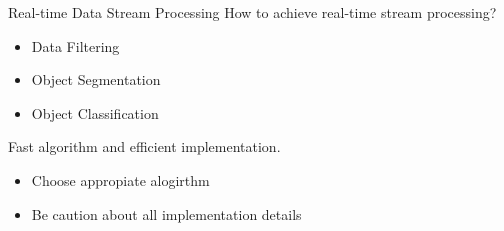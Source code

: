 \documentclass[9pt]{beamer}
\begin{document}
\begin{frame}[fragile]{Real-time Data Stream Processing}
How to achieve real-time stream processing? 
	
\begin{itemize}
	\item {} Data Filtering
	\item {} Object Segmentation
	\item {} Object Classification
\end{itemize}

Fast algorithm and efficient implementation. 

\begin{itemize}
	\item Choose appropiate alogirthm
	\item Be caution about all implementation details
\end{itemize}

\end{frame}
\end{document}
